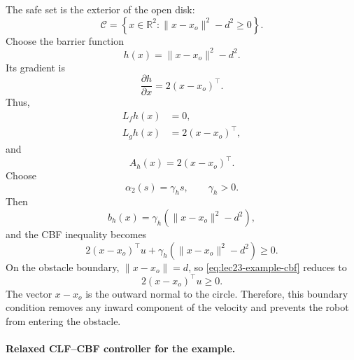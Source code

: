 \documentclass[../../master-handout.tex]{subfiles}
\begin{document}
The safe set is the exterior of the open disk:
\begin{equation}
    \mathcal{C}
    =
    \left\{
        x\in\mathbb{R}^{2}
        :
        \|x-x_o\|^2-d^2\geq 0
    \right\}.
    \label{eq:lec23-example-safe-set}
\end{equation}
Choose the barrier function
\begin{equation}
    h(x)
    =
    \|x-x_o\|^2-d^2.
    \label{eq:lec23-example-h}
\end{equation}
Its gradient is
\begin{equation}
    \frac{\partial h}{\partial x}
    =
    2(x-x_o)^\top.
\end{equation}
Thus,
\begin{align}
    L_fh(x)&=0,
    \\
    L_gh(x)&=2(x-x_o)^\top,
\end{align}
and
\begin{equation}
    A_h(x)
    =
    2(x-x_o)^\top.
    \label{eq:lec23-example-Ah}
\end{equation}
Choose
\begin{equation}
    \alpha_2(s)=\gamma_hs,
    \qquad
    \gamma_h>0.
\end{equation}
Then
\begin{equation}
    b_h(x)
    =
    \gamma_h
    \left(
        \|x-x_o\|^2-d^2
    \right),
    \label{eq:lec23-example-bh}
\end{equation}
and the CBF inequality becomes
\begin{equation}
    2(x-x_o)^\top u
    +
    \gamma_h
    \left(
        \|x-x_o\|^2-d^2
    \right)
    \geq
    0.
    \label{eq:lec23-example-cbf}
\end{equation}
On the obstacle boundary, $\|x-x_o\|=d$, so \eqref{eq:lec23-example-cbf} reduces to
\begin{equation}
    2(x-x_o)^\top u\geq 0.
\end{equation}
The vector $x-x_o$ is the outward normal to the circle. Therefore, this boundary condition removes any inward component of the velocity and prevents the robot from entering the obstacle.

\paragraph{Relaxed CLF--CBF controller for the example.}
\end{document}
